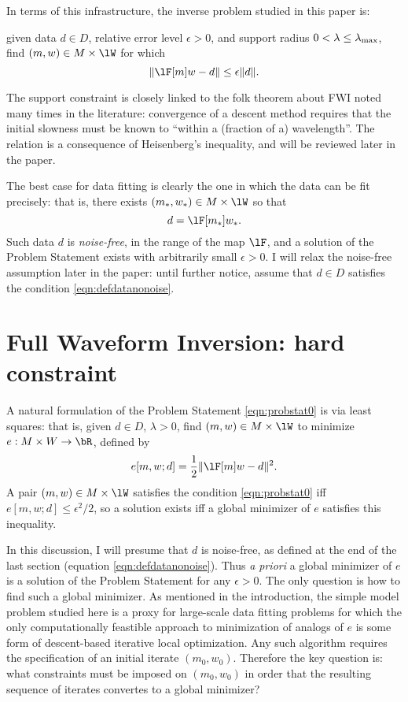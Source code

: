 In terms of this infrastructure, the inverse problem studied in 
this paper is: 

 given data $d \in D$, relative 
error level $\epsilon >0$, and support radius $0 <\lambda \le 
\lambda_{\rm max}$, find 
$(m,w) \in M \times \lW$ for which 
\begin{equation}
  \label{eqn:probstat0}
  \|\lF[m]w-d\| \le \epsilon\|d\|. 
\end{equation}

 The support constraint is closely linked to the
folk theorem about FWI noted many times in the literature: convergence
of a descent method requires that the initial slowness must be known
to ``within a (fraction of a) wavelength''. The relation is a
consequence of Heisenberg's inequality, and will be reviewed later in
the paper.

The best case for data fitting
is clearly the one in which the data can be fit precisely: that is,
there exists $(m_*,w_*) \in M\times \lW$ so that
\begin{equation}
  \label{eqn:defdatanonoise}
  d=\lF[m_*]w_*.
\end{equation}
Such data $d$ is {\em noise-free}, in the range of the map $\lF$, and a solution of the Problem Statement
exists with arbitrarily small $\epsilon>0$. I will relax the noise-free assumption
later in the paper: until further notice, assume that $d \in
D$ satisfies the condition \ref{eqn:defdatanonoise}.

\section{Full Waveform Inversion: hard constraint}
A natural formulation of the Problem Statement \ref{eqn:probstat0} is
via least squares: that is, given $d \in D$, $\lambda >0$, find $(m,w)
\in M \times \lW$ to minimize $e: M \times W
 \rightarrow \bR$, defined by
\begin{equation}
  \label{eqn:FWI}
  e[m,w;d] = \frac{1}{2}\|\lF[m]w-d\|^2.
\end{equation}
A pair $(m,w) \in M\times \lW$
satisfies the condition \ref{eqn:probstat0} iff $e[m,w;d] \le \epsilon^2/2$, so a solution exists iff a 
global minimizer of $e$ satisfies this inequality.

In this discussion, I will presume that $d$ is 
noise-free, as defined at the end of the last section (equation
\ref{eqn:defdatanonoise}). Thus {\em a priori} a global minimizer of
$e$ is a solution of the Problem Statement for any
$\epsilon > 0$. The only
question is how to find such a global minimizer. As mentioned in the
introduction, the simple model problem studied here is a proxy for
large-scale data fitting problems for which the only computationally
feastible approach to minimization of analogs of $e$
is some form of descent-based iterative local optimization. Any such
algorithm requires the specification of an initial iterate
$(m_0,w_0)$. Therefore the key question is: what
constraints must be imposed on $(m_0,w_0)$ in order that the resulting
sequence of iterates convertes to a global minimizer?  

